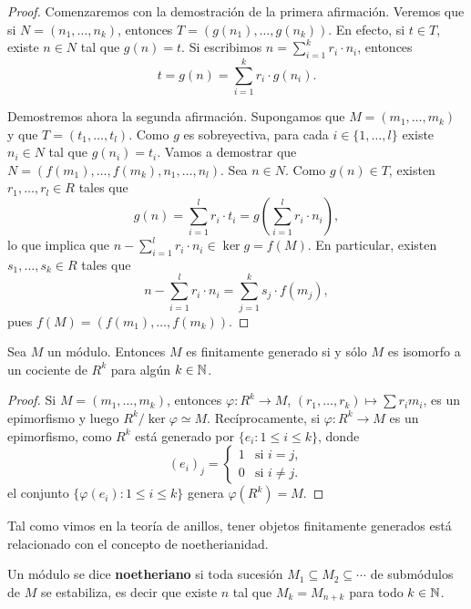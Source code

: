 \begin{proof}
Comenzaremos con la demostración de la primera afirmación. Veremos que si $N=(n_1,\dots,n_k)$, entonces $T=(g(n_1),\dots,g(n_k))$. En efecto,
si $t\in T$, existe $n\in N$ tal que $g(n)=t$. Si escribimos
$n=\sum_{i=1}^k r_i\cdot n_i$, entonces 
\[
t=g(n)=\sum_{i=1}^k r_i\cdot g(n_i).
\] 

Demostremos ahora la segunda afirmación. 
Supongamos que $M=(m_1,\dots,m_k)$ y que $T=(t_1,\dots,t_l)$. Como $g$ es sobreyectiva,
para cada $i\in\{1,\dots,l\}$ existe $n_i\in N$ tal que $g(n_i)=t_i$. Vamos a demostrar que 
$N=(f(m_1),\dots,f(m_k),n_1,\dots,n_l)$. Sea $n\in N$. Como $g(n)\in T$, existen $r_1,\dots,r_l\in R$ tales que
\[
g(n)=\sum_{i=1}^l r_i\cdot t_i=g\left(\sum_{i=1}^l r_i\cdot n_i\right),
\]	
lo que implica que $n-\sum_{i=1}^l r_i\cdot n_i\in\ker g=f(M)$. En particular, existen $s_1,\dots,s_k\in R$ tales
que
\[
n-\sum_{i=1}^l r_i\cdot n_i=\sum_{j=1}^k s_j\cdot f(m_j),
\]
pues $f(M)=(f(m_1),\dots,f(m_k))$. 
\end{proof}


\begin{proposition}
Sea $M$ un módulo. Entonces $M$ es finitamente generado si y sólo $M$ 
es isomorfo a un cociente de $R^k$ para algún $k\in\mathbb{N}$. 	
\end{proposition}

\begin{proof}
Si $M=(m_1,\dots,m_k)$, entonces $\varphi\colon R^k\to M$, $(r_1,\dots,r_k)\mapsto \sum r_im_i$, es un epimorfismo
y luego $R^k/\ker\varphi\simeq M$. Recíprocamente, si $\varphi\colon R^k\to M$ es un epimorfismo, como
$R^k$ está generado por $\{e_i:1\leq i\leq k\}$, donde 
\[
(e_i)_j=\begin{cases}
1 & \text{si $i=j$},\\
0 & \text{si $i\ne j$}.	
\end{cases}
\]
el conjunto $\{\varphi(e_i):1\leq i\leq k\}$ genera $\varphi(R^k)=M$. 
\end{proof}

Tal como vimos en la teoría de anillos, tener objetos finitamente generados está relacionado con el concepto de noetherianidad. 

\begin{definition}
Un módulo se dice \textbf{noetheriano} si toda sucesión $M_1\subseteq M_2\subseteq\cdots$ de submódulos de $M$ 
se estabiliza, es decir que existe $n$ tal que $M_k=M_{n+k}$ para todo $k\in\mathbb{N}$. 	
\end{definition}

